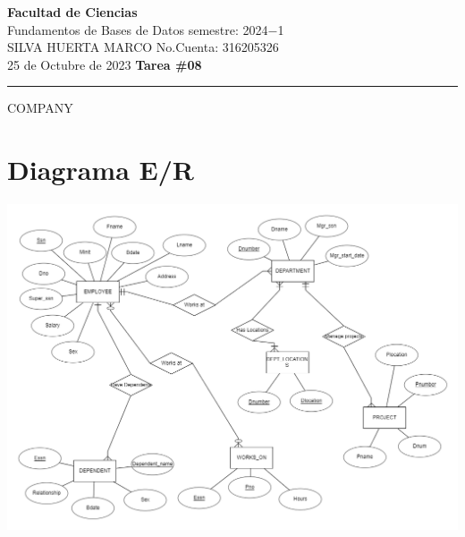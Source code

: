 \documentclass[a4paper,12pt]{article}
\begin{document}
\pagecolor{black}
\color{white}

\thispagestyle{firstpage} %
\noindent
\large\textbf{Facultad de Ciencias} \\
Fundamentos de Bases de Datos \hfill semestre: 2024$-$1 \\
\textsc{SILVA HUERTA MARCO}   \hfill No.Cuenta: 316205326    \\
25 de Octubre de 2023      \hfill \textbf{Tarea \#08}    \\

\noindent\rule{7.3in}{2.8pt}

\begin{center}
    \Large{COMPANY}
\end{center}


\section*{Diagrama E/R}
\begin{center}
    \includegraphics[scale = .5]{IMA/imageED.png}
\end{center}
\end{document}
